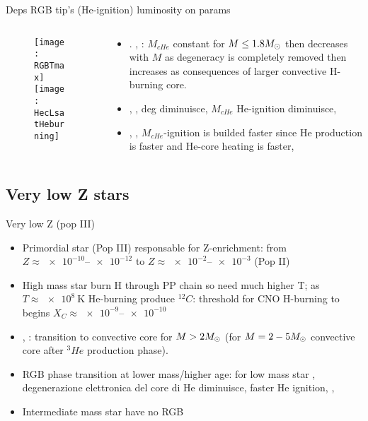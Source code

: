 \begin{frame}{Deps RGB tip's (He-ignition) luminosity on params}
\begin{columns}[T]\begin{column}{0.5\textwidth}
\begin{figure}[!ht]
\texttt{[image: RGBTmax]}\label{fig:RGBTmax}
\texttt{[image: HecLsatHeburning]}\label{fig:HecLsatHeburning}
\end{figure}
\end{column}
\begin{column}{0.45\textwidth}
\begin{itemize}
    \item {}. , : $M_{cHe}$ constant for $M\leq1.8M_{\odot}{}$ then decreases with $M$ as degeneracy is completely removed then increases as consequences of larger convective H-burning core.
    \item {}, , deg \Pelectron diminuisce, $M_{cHe}$ He-ignition diminuisce, 
    \item {}, , $M_{cHe}$-ignition is builded faster since He production is faster and He-core heating is faster, 
\end{itemize}
\end{column}\end{columns}
\end{frame}

\subsection{Very low Z stars}

\begin{frame}{Very low Z (pop III)}
\begin{itemize}
    \item Primordial star (Pop III) responsable for Z-enrichment: from $Z\approx\numrange{e-10}{e-12}$ to $Z\approx\numrange{e-2}{e-3}$ (Pop II)
    \item High mass star burn H through PP chain so need much higher T; as $T\approx\SI{e8}{\kelvin}$ He-burning produce $^{12}C$: threshold for CNO H-burning to begins $X_C\approx\numrange{e-9}{e-10}$
    \item {}, : transition to convective core for $M>2M_{\odot}{}$ (for $M=2-5M_{\odot}{}$ convective core after $^3He$ production phase).
    \item RGB phase transition at lower mass/higher age: for low mass star , degenerazione elettronica del core di He diminuisce, faster He ignition, , 
    \item Intermediate mass star have no RGB
\end{itemize}
\end{frame}

